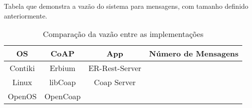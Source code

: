 Tabela que demonstra a vaz\~ao do sistema para mensagens, com tamanho definido anteriormente.

\begin{table}[H]
    \label{throughputCoap}
    \centering
        \begin{tabular}{@{}cccc@{}}
            \toprule
            OS & CoAP & App & N\'umero de Mensagens\\ \midrule
            Contiki & Erbium & ER-Rest-Server &  \\
            Linux & libCoap & Coap Server &  \\
            OpenOS & OpenCoap &  &  \\
            \bottomrule
        \end{tabular}
    \caption{Compara\c{c}\~ao da vaz\~ao entre as  implementa\c{c}\~oes}
\end{table}
